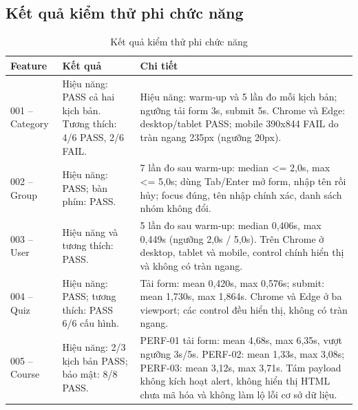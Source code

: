 \subsection{Kết quả kiểm thử phi chức năng}
\begin{table}[H]
\centering
\caption{Kết quả kiểm thử phi chức năng}
\label{tab:nfr-results}
\small
\begin{tabular}{|p{2.2cm}|p{3.4cm}|p{7.1cm}|}
\hline
\textbf{Feature} & \textbf{Kết quả} & \textbf{Chi tiết} \\
\hline
001 -- Category & Hiệu năng: PASS cả hai kịch bản. Tương thích: 4/6 PASS, 2/6 FAIL. & Hiệu năng: warm-up và 5 lần đo mỗi kịch bản; ngưỡng tải form 3s, submit 5s. Chrome và Edge: desktop/tablet PASS; mobile 390x844 FAIL do tràn ngang 235px (ngưỡng 20px). \\
\hline
002 -- Group & Hiệu năng: PASS; bàn phím: PASS. & 7 lần đo sau warm-up: median <= 2,0s, max <= 5,0s; dùng Tab/Enter mở form, nhập tên rồi hủy; focus đúng, tên nhập chính xác, danh sách nhóm không đổi. \\
\hline
003 -- User & Hiệu năng và tương thích: PASS. & 5 lần đo sau warm-up: median 0,406s, max 0,449s (ngưỡng 2,0s / 5,0s). Trên Chrome ở desktop, tablet và mobile, control chính hiển thị và không có tràn ngang. \\
\hline
004 -- Quiz & Hiệu năng: PASS; tương thích: PASS 6/6 cấu hình. & Tải form: mean 0,420s, max 0,576s; submit: mean 1,730s, max 1,864s. Chrome và Edge ở ba viewport; các control đều hiển thị, không có tràn ngang. \\
\hline
005 -- Course & Hiệu năng: 2/3 kịch bản PASS; bảo mật: 8/8 PASS. & PERF-01 tải form: mean 4,68s, max 6,35s, vượt ngưỡng 3s/5s. PERF-02: mean 1,33s, max 3,08s; PERF-03: mean 3,12s, max 3,71s. Tám payload không kích hoạt alert, không hiển thị HTML chưa mã hóa và không làm lộ lỗi cơ sở dữ liệu. \\
\hline
\end{tabular}
\end{table}

